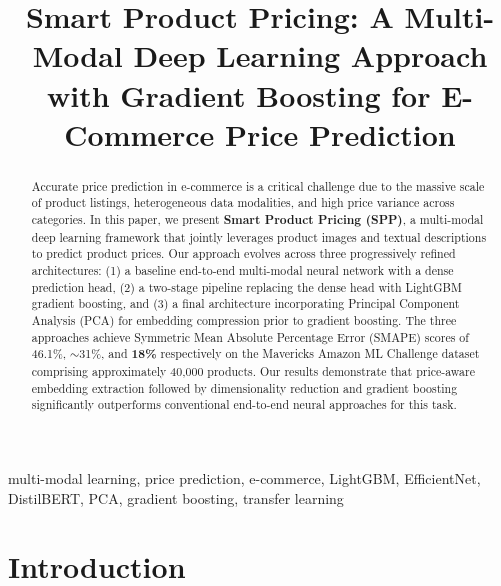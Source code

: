 \documentclass[conference]{IEEEtran}
\begin{document}
\title{Smart Product Pricing: A Multi-Modal Deep Learning Approach with Gradient Boosting for E-Commerce Price Prediction}

\author{
}

\maketitle

\begin{abstract}
Accurate price prediction in e-commerce is a critical challenge due to the massive scale of product listings, heterogeneous data modalities, and high price variance across categories. In this paper, we present \textbf{Smart Product Pricing (SPP)}, a multi-modal deep learning framework that jointly leverages product images and textual descriptions to predict product prices. Our approach evolves across three progressively refined architectures: (1) a baseline end-to-end multi-modal neural network with a dense prediction head, (2) a two-stage pipeline replacing the dense head with LightGBM gradient boosting, and (3) a final architecture incorporating Principal Component Analysis (PCA) for embedding compression prior to gradient boosting. The three approaches achieve Symmetric Mean Absolute Percentage Error (SMAPE) scores of 46.1\%, $\sim$31\%, and \textbf{18\%} respectively on the Mavericks Amazon ML Challenge dataset comprising approximately 40,000 products. Our results demonstrate that price-aware embedding extraction followed by dimensionality reduction and gradient boosting significantly outperforms conventional end-to-end neural approaches for this task.
\end{abstract}

\begin{IEEEkeywords}
multi-modal learning, price prediction, e-commerce, LightGBM, EfficientNet, DistilBERT, PCA, gradient boosting, transfer learning
\end{IEEEkeywords}

\section{Introduction}
\end{document}
